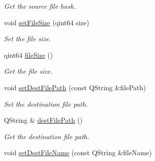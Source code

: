 \begin{DoxyCompactItemize}
\begin{DoxyCompactList}\small\item\em Get the source file hash. \end{DoxyCompactList}\item 
\hypertarget{classmdt_file_copier_item_a6509cd06e9d1b27d9a7ecf3a384fe673}{
void \hyperlink{classmdt_file_copier_item_a6509cd06e9d1b27d9a7ecf3a384fe673}{setFileSize} (qint64 size)}
\label{classmdt_file_copier_item_a6509cd06e9d1b27d9a7ecf3a384fe673}

\begin{DoxyCompactList}\small\item\em Set the file size. \end{DoxyCompactList}\item 
\hypertarget{classmdt_file_copier_item_af0bb0ba7fd66473472f55695414519b7}{
qint64 \hyperlink{classmdt_file_copier_item_af0bb0ba7fd66473472f55695414519b7}{fileSize} ()}
\label{classmdt_file_copier_item_af0bb0ba7fd66473472f55695414519b7}

\begin{DoxyCompactList}\small\item\em Get the file size. \end{DoxyCompactList}\item 
\hypertarget{classmdt_file_copier_item_ab6155e256fe82b65f65c1c0519090d0a}{
void \hyperlink{classmdt_file_copier_item_ab6155e256fe82b65f65c1c0519090d0a}{setDestFilePath} (const QString \&filePath)}
\label{classmdt_file_copier_item_ab6155e256fe82b65f65c1c0519090d0a}

\begin{DoxyCompactList}\small\item\em Set the destination file path. \end{DoxyCompactList}\item 
\hypertarget{classmdt_file_copier_item_ab5993351e732b94e723621f5227fdd90}{
QString \& \hyperlink{classmdt_file_copier_item_ab5993351e732b94e723621f5227fdd90}{destFilePath} ()}
\label{classmdt_file_copier_item_ab5993351e732b94e723621f5227fdd90}

\begin{DoxyCompactList}\small\item\em Get the destination file path. \end{DoxyCompactList}\item 
\hypertarget{classmdt_file_copier_item_a6a600719fa48e8b92ec93e024c482302}{
void \hyperlink{classmdt_file_copier_item_a6a600719fa48e8b92ec93e024c482302}{setDestFileName} (const QString \&fileName)}
\label{classmdt_file_copier_item_a6a600719fa48e8b92ec93e024c482302}


\end{DoxyCompactItemize}
